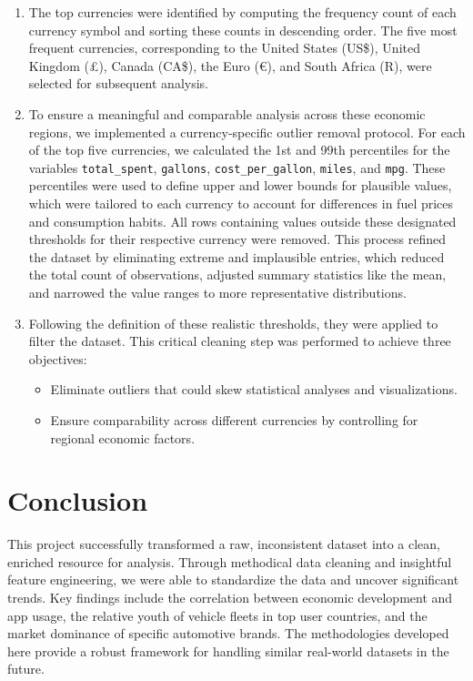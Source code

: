 \documentclass{article}
\begin{document}
\begin{enumerate}
    \item The top currencies were identified by computing the frequency count of each currency symbol and sorting these counts in descending order. The five most frequent currencies, corresponding to the United States (US\$), United Kingdom (£), Canada (CA\$), the Euro (€), and South Africa (R), were selected for subsequent analysis.

    \item To ensure a meaningful and comparable analysis across these economic regions, we implemented a currency-specific outlier removal protocol. For each of the top five currencies, we calculated the 1st and 99th percentiles for the variables \texttt{total\_spent}, \texttt{gallons}, \texttt{cost\_per\_gallon}, \texttt{miles}, and \texttt{mpg}. These percentiles were used to define upper and lower bounds for plausible values, which were tailored to each currency to account for differences in fuel prices and consumption habits. All rows containing values outside these designated thresholds for their respective currency were removed. This process refined the dataset by eliminating extreme and implausible entries, which reduced the total count of observations, adjusted summary statistics like the mean, and narrowed the value ranges to more representative distributions.

    \item Following the definition of these realistic thresholds, they were applied to filter the dataset. This critical cleaning step was performed to achieve three objectives:
    \begin{itemize}
        \item Eliminate outliers that could skew statistical analyses and visualizations.
        \item Ensure comparability across different currencies by controlling for regional economic factors.
    \end{itemize}
\end{enumerate}

\section{Conclusion}
This project successfully transformed a raw, inconsistent dataset into a clean, enriched resource for analysis. Through methodical data cleaning and insightful feature engineering, we were able to standardize the data and uncover significant trends. Key findings include the correlation between economic development and app usage, the relative youth of vehicle fleets in top user countries, and the market dominance of specific automotive brands. The methodologies developed here provide a robust framework for handling similar real-world datasets in the future.
\end{document}
